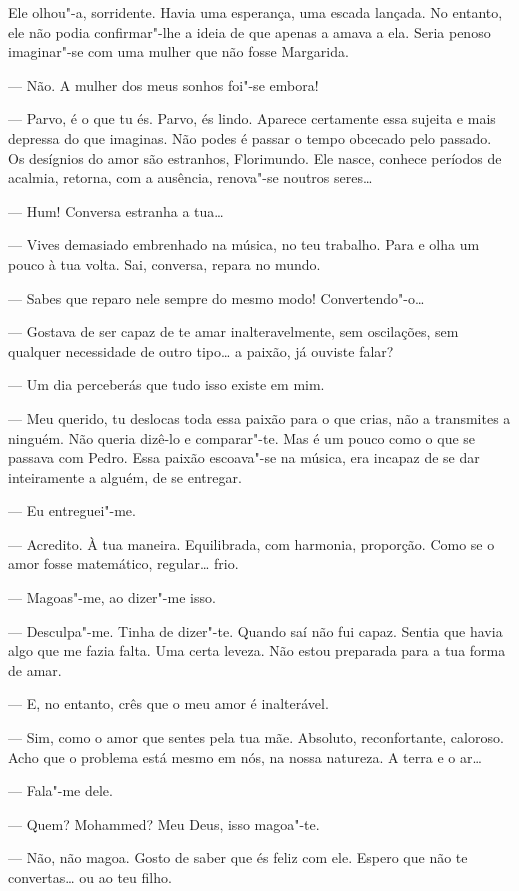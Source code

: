 Ele olhou"-a, sorridente. Havia uma esperança, uma escada lançada. No
entanto, ele não podia confirmar"-lhe a ideia de que apenas a amava a
ela. Seria penoso imaginar"-se com uma mulher que não fosse Margarida.

--- Não. A mulher dos meus sonhos foi"-se embora!

--- Parvo, é o que tu és. Parvo, és lindo. Aparece certamente essa sujeita
e mais depressa do que imaginas. Não podes é passar o tempo obcecado
pelo passado. Os desígnios do amor são estranhos, Florimundo. Ele nasce,
conhece períodos de acalmia, retorna, com a ausência, renova"-se noutros
seres\ldots{}

--- Hum! Conversa estranha a tua\ldots{}

--- Vives demasiado embrenhado na música, no teu trabalho. Para e olha um
pouco à tua volta. Sai, conversa, repara no mundo.

--- Sabes que reparo nele sempre do mesmo modo! Convertendo"-o\ldots{}

--- Gostava de ser capaz de te amar inalteravelmente, sem oscilações, sem
qualquer necessidade de outro tipo\ldots{} a paixão, já ouviste falar?

--- Um dia perceberás que tudo isso existe em mim.

--- Meu querido, tu deslocas toda essa paixão para o que crias, não a
transmites a ninguém. Não queria dizê-lo e comparar"-te. Mas é um pouco
como o que se passava com Pedro. Essa paixão escoava"-se na música, era
incapaz de se dar inteiramente a alguém, de se entregar.

--- Eu entreguei"-me.

--- Acredito. À tua maneira. Equilibrada, com harmonia, proporção. Como se
o amor fosse matemático, regular\ldots{} frio.

--- Magoas"-me, ao dizer"-me isso.

--- Desculpa"-me. Tinha de dizer"-te. Quando saí não fui capaz. Sentia que
havia algo que me fazia falta. Uma certa leveza. Não estou preparada
para a tua forma de amar.

--- E, no entanto, crês que o meu amor é inalterável.

--- Sim, como o amor que sentes pela tua mãe. Absoluto, reconfortante,
caloroso. Acho que o problema está mesmo em nós, na nossa natureza. A
terra e o ar\ldots{}

--- Fala"-me dele.

--- Quem? Mohammed? Meu Deus, isso magoa"-te.

--- Não, não magoa. Gosto de saber que és feliz com ele. Espero que não te
convertas\ldots{} ou ao teu filho.

